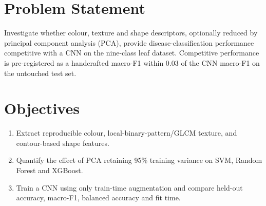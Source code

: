 \section{Problem Statement}
Investigate whether colour, texture and shape descriptors, optionally reduced by principal component analysis (PCA), provide disease-classification performance competitive with a CNN on the nine-class leaf dataset. Competitive performance is pre-registered as a handcrafted macro-F1 within 0.03 of the CNN macro-F1 on the untouched test set.

\section{Objectives}
\begin{enumerate}
\item Extract reproducible colour, local-binary-pattern/GLCM texture, and contour-based shape features.
\item Quantify the effect of PCA retaining 95\% training variance on SVM, Random Forest and XGBoost.
\item Train a CNN using only train-time augmentation and compare held-out accuracy, macro-F1, balanced accuracy and fit time.
\end{enumerate}
